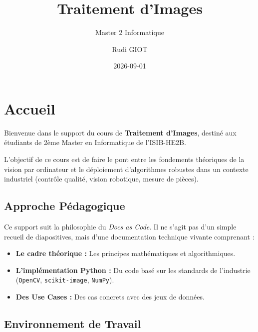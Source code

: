 \documentclass[
  letterpaper,
  DIV=11,
  numbers=noendperiod]{scrreprt}
\title{Traitement d'Images}
\subtitle{Master 2 Informatique}
\author{Rudi GIOT}
\date{2026-09-01}
\providecommand{\tightlist}{%
  \setlength{\itemsep}{0pt}\setlength{\parskip}{0pt}}
\renewcommand*\contentsname{Table of contents}
\newcommand\contentsname{Table of contents}
\begin{document}
\maketitle

\renewcommand*\contentsname{Table of contents}
{
\setcounter{tocdepth}{2}
\tableofcontents
}


\chapter*{Accueil}\label{accueil}


Bienvenue dans le support du cours de \textbf{Traitement d'Images},
destiné aux étudiants de 2ème Master en Informatique de l'ISIB-HE2B.

L'objectif de ce cours est de faire le pont entre les fondements
théoriques de la vision par ordinateur et le déploiement d'algorithmes
robustes dans un contexte industriel (contrôle qualité, vision
robotique, mesure de pièces).

\section*{Approche Pédagogique}\label{approche-puxe9dagogique}


Ce support suit la philosophie du \emph{Docs as Code}. Il ne s'agit pas
d'un simple recueil de diapositives, mais d'une documentation technique
vivante comprenant :

\begin{itemize}
\tightlist
\item
  \textbf{Le cadre théorique :} Les principes mathématiques et
  algorithmiques.
\item
  \textbf{L'implémentation Python :} Du code basé sur les standards de
  l'industrie (\texttt{OpenCV}, \texttt{scikit-image}, \texttt{NumPy}).
\item
  \textbf{Des Use Cases :} Des cas concrets avec des jeux de données.
\end{itemize}

\section*{Environnement de Travail}\label{environnement-de-travail}
\end{document}
